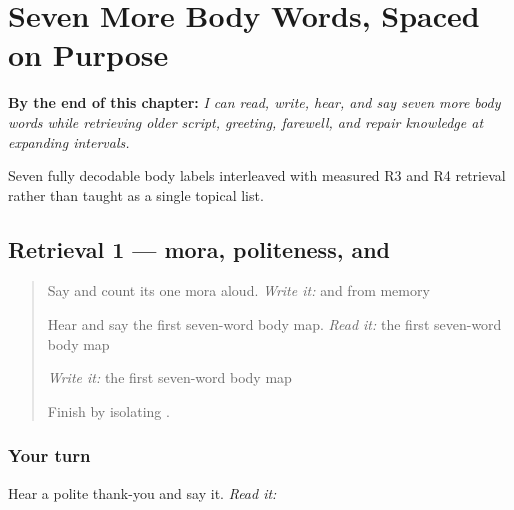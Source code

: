 
\chapter{Seven More Body Words, Spaced on Purpose}
\label{ch:ja-body-seven-more}

\begin{chapteropening}
\textbf{By the end of this chapter:} \emph{I can read, write, hear, and say seven more body words while retrieving older script, greeting, farewell, and repair knowledge at expanding intervals.}

Seven fully decodable body labels interleaved with measured R3 and R4 retrieval rather than taught as a single topical list.
\end{chapteropening}

\section[Practice]{Retrieval 1 — mora, politeness, and }

\label{lesson:JA-R12-foundation-01}



\begin{quote}
Say \textbf{} and count its one mora aloud. \emph{Write it:} \textbf{} and \textbf{} from memory

Hear and say the first seven-word body map. \emph{Read it:} the first seven-word body map

\emph{Write it:} the first seven-word body map

Finish by isolating \textbf{}.
\end{quote}

\subsection*{Your turn}
Hear a polite thank-you and say it. \emph{Read it:} \textbf{}


